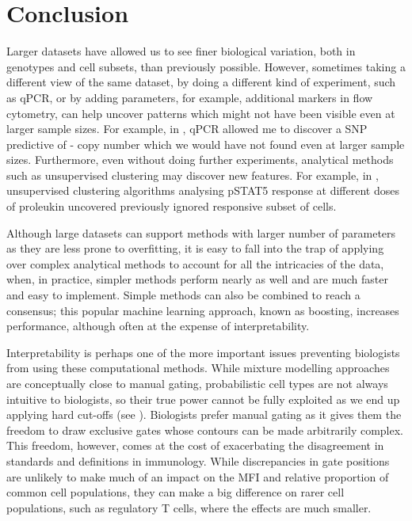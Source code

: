 \section{Conclusion}

Larger datasets have allowed us to see finer biological variation, both in genotypes and cell subsets, than previously possible.
However, sometimes taking a different view of the same dataset, by doing a different kind of experiment, such as qPCR, or by adding parameters, for example, additional markers in flow cytometry, can help uncover patterns which might not have been visible even at larger sample sizes.
For example, in , qPCR allowed me to discover a SNP predictive of - copy number which we would have not found even at larger sample sizes.
Furthermore, even without doing further experiments, analytical methods such as unsupervised clustering may discover new features.
For example, in , unsupervised clustering algorithms analysing pSTAT5 response at different doses of proleukin uncovered previously ignored responsive subset of cells.

Although large datasets can support methods with larger number of parameters as they are less prone to overfitting,
it is easy to fall into the trap of applying over complex analytical methods to account for all the intricacies of the data,
when, in practice, simpler methods perform nearly as well and are much faster and easy to implement.
Simple methods can also be combined to reach a consensus; this popular machine learning approach, known as boosting, increases performance, although often at the expense of interpretability.

Interpretability is perhaps one of the more important issues preventing biologists from using these computational methods.
While mixture modelling approaches are conceptually close to manual gating, probabilistic cell types are not always intuitive to biologists, so their true power cannot be fully exploited as we end up applying hard cut-offs (see ).
Biologists prefer manual gating as it gives them the freedom to draw exclusive gates whose contours can be made arbitrarily complex.
This freedom, however, comes at the cost of exacerbating the disagreement in standards and definitions in immunology.
While discrepancies in gate positions are unlikely to make much of an impact on the MFI and relative proportion of common cell populations, they can make a big difference on rarer cell populations, such as regulatory T cells, where the effects are much smaller.

